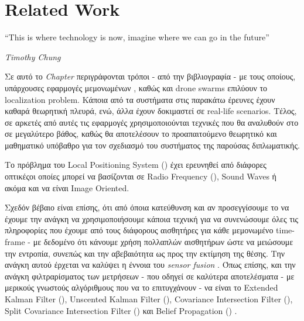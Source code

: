 \chapter{Related Work} \label{chap:Chapter2}       
\epigraph{``This is where technology is now, imagine where we can go in the future” }{\textit{Timothy Chung}}

Σε αυτό το \emph{Chapter} περιγράφονται τρόποι - από την βιβλιογραφία - με τους οποί\-ους, υπάρχουσες εφαρμογές 
μεμονωμένων , καθώς και drone swarms επιλύουν το localization pro\-blem. Κάποια από τα συστήματα στις 
παρακάτω έρευνες έχουν καθαρά θεωρητική πλευρά, ενώ, άλλα έχουν δοκιμαστεί σε real-life scenarios.
Τέλος, σε α\-ρκε\-τές από αυτές τις εφαρμογές χρησιμοποιούνται τεχνικές που θα αναλυθούν στο 
σε μεγαλύτερο βάθος, καθώς θα αποτελέσουν το προαπαιτούμενο θεωρητικό και μαθηματικό υπόβαθρο για τον σχεδιασμό 
του συστήματος της παρούσας διπλωματικής.

Το πρόβλημα του Local Positioning System () \cite{lps} έχει ερευνηθεί από διάφορες οπτικές\udot οι 
οποίες μπορεί να βασίζονται σε Radio Frequency (), Sound Waves ή ακόμα και να είναι Image Oriented.

Σχεδόν βέβαιο είναι επίσης, ότι από όποια κατεύθυνση και αν προσεγγίσουμε το  να έχουμε την ανάγκη να 
χρησιμοποιήσουμε κάποια τεχνική για να συνενώσουμε όλες τις πληροφορίες που έχουμε από τους διάφορους αισθητήρες 
για κάθε μεμονωμένο time-frame - με δεδομένο ότι κάνουμε χρήση πολλαπλών αισθητήρων ώστε να μειώσουμε την εντροπία, 
συνεπώς και την αβεβαιότητα ως προς την εκτίμηση της θέσης. 
Την ανάγκη αυτού έρχεται να καλύψει η έννοια του \emph{sensor fusion} \cite{sensor-fusion}. Όπως επίσης, και την 
ανάγκη φιλτραρίσματος των μετρήσεων - που οδηγεί σε καλύτερα αποτε\-λέ\-σμα\-τα - με μερικούς γνωστούς αλγόριθμους 
που να το επιτυγχάνουν - να είναι το Extended Kalman Filter (), Unscented Kalman Filter (), 
Covariance Intersection Filter (),  Split  Covariance  Intersection  Filter () και  Belief  
Propagation () \cite{fusion-filters}. 

